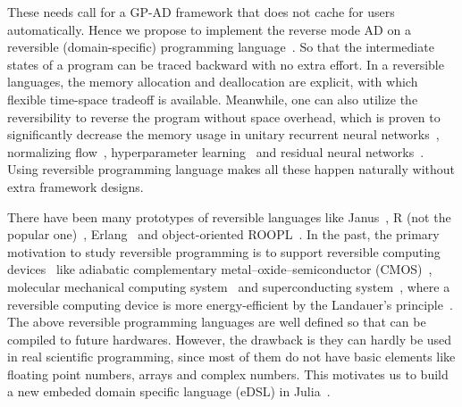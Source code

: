 \documentclass{article}
\newcommand{\<}{\langle}
\renewcommand{\>}{\rangle}
\theoremstyle{definition}\newtheorem{definition}{\textit{Definition}}
\begin{document}
    These needs call for a GP-AD framework that does not cache for users automatically. Hence we propose to implement the reverse mode AD on a reversible (domain-specific) programming language~\cite{Perumalla2013,Frank2017}. So that the intermediate states of a program can be traced backward with no extra effort.
In a reversible languages, the memory allocation and deallocation are explicit, with which flexible time-space tradeoff is available.
Meanwhile, one can also utilize the reversibility to reverse the program without space overhead, which is proven to significantly decrease the memory usage in unitary recurrent neural networks~\cite{MacKay2018}, normalizing flow~\cite{Dinh2014}, hyperparameter learning~\cite{Maclaurin2015} and residual neural networks~\cite{Behrmann2018}. Using reversible programming language makes all these happen naturally without extra framework designs.

 There have been many prototypes of reversible languages like Janus~\cite{Lutz1986}, R (not the popular one)~\cite{Frank1997}, Erlang~\cite{Lanese2018} and object-oriented ROOPL~\cite{Haulund2017}. %
    In the past, the primary motivation to study reversible programming is to support reversible computing devices~\cite{Frank1999} like adiabatic complementary metal–oxide–semiconductor (CMOS)~\cite{Koller1992}, molecular mechanical computing system~\cite{Merkle2018} and superconducting system~\cite{Likharev1977,Semenov2003}, where a reversible computing device is more energy-efficient by the Landauer's principle~\cite{Landauer1961}.
    The above reversible programming languages are well defined so that can be compiled to future hardwares. However, the drawback is they can hardly be used in real scientific programming, since most of them do not have basic elements like floating point numbers, arrays and complex numbers. This motivates us to build a new embeded domain specific language (eDSL) in Julia~\cite{Bezanson2012,Bezanson2017}.
\end{document}
